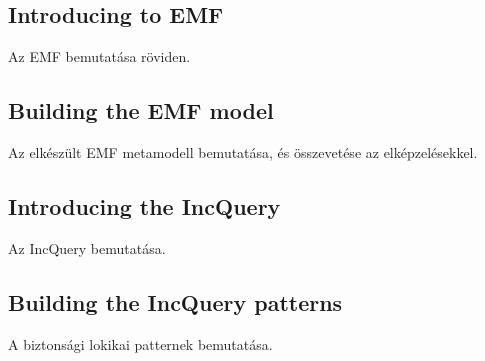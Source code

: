\subsection{Introducing to EMF}
Az EMF bemutatása röviden.
\subsection{Building the EMF model}
Az elkészült EMF metamodell bemutatása, és összevetése az elképzelésekkel.
\subsection{Introducing the IncQuery}
Az IncQuery bemutatása.
\subsection{Building the IncQuery patterns}
\label{sec:case_study:pattern_building}
A biztonsági lokikai patternek bemutatása.